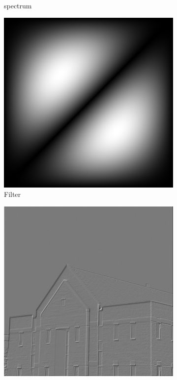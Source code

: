 \documentclass[
	12pt, %
]{style/fphw}
\begin{document}
\begin{figure}[H]
\begin{subfigure}[b]{0.45\textwidth}
         \caption{spectrum}
         \label{Q5_1_spectrum.png}
     \end{subfigure}
     \vfill
     \begin{subfigure}[b]{0.45\textwidth}
         \centering
         \includegraphics[width=\textwidth]{plots2/Q5_1_filter.png}
         \caption{Filter}
         \label{Q5_1_filter.png}
     \end{subfigure}
     \hfill
     \begin{subfigure}[b]{0.45\textwidth}
         \centering
         \includegraphics[width=\textwidth]{plots2/Q5_1_frequency.png}

\end{subfigure}
\end{figure}
\end{document}
